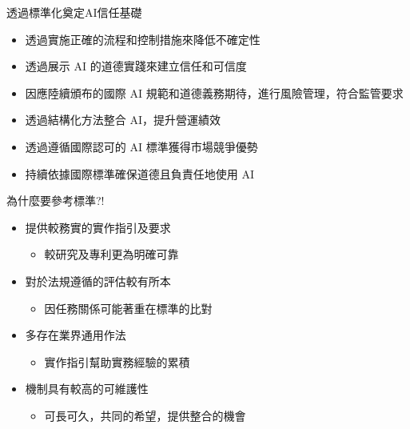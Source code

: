 \documentclass[aspectratio=1610]{Common/MyCourseBeamer}
\begin{document}
\begin{frame}[allowframebreaks]{透過標準化奠定AI信任基礎}
	
	\begin{itemize}
		\item 透過實施正確的流程和控制措施來降低不確定性
		
		\item 透過展示 AI 的道德實踐來建立信任和可信度
		
		\item 因應陸續頒布的國際 AI 規範和道德義務期待，進行風險管理，符合監管要求
		
		\item 透過結構化方法整合 AI，提升營運績效
		
		\item 透過遵循國際認可的 AI 標準獲得市場競爭優勢
		
		\item 持續依據國際標準確保道德且負責任地使用 AI
		
	\end{itemize}
	
\end{frame}


\begin{frame}[allowframebreaks]{為什麼要參考標準?!}
	
	\begin{itemize}
		\item 提供較務實的實作指引及要求
			\begin{itemize}
				\item 較研究及專利更為明確可靠
			\end{itemize}
		
		\item 對於法規遵循的評估較有所本
			\begin{itemize}
				\item 因任務關係可能著重在標準的比對
			\end{itemize}
			
		\item 多存在業界通用作法
			\begin{itemize}
				\item 實作指引幫助實務經驗的累積
			\end{itemize}
			
		\item 機制具有較高的可維護性
			\begin{itemize}
				\item 可長可久，共同的希望，提供整合的機會
			\end{itemize}
		
		
	\end{itemize}
	
\end{frame}
\end{document}
